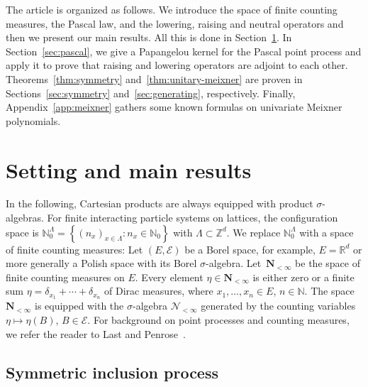 \documentclass[pdftex]{sigma}
\numberwithin{equation}{section}
\newcommand{\N}{\mathbb{N}}
\newcommand{\R}{\mathbb{R}}
\newcommand{\Z}{\mathbb{Z}}
\newcommand{\set}[1]{{\left \{ #1 \right \}}}
\newcommand{\1}{\mathbbm{1}}
\begin{document}
The article is organized as follows. We introduce the space of finite counting measures, the Pascal law, and the lowering, raising and neutral operators and then we present our main results. All this is done in Section~\ref{sec:setting-results}. In Section~\ref{sec:pascal}, we give a Papangelou kernel for the Pascal point process and apply it to prove that raising and lowering operators are adjoint to each other. Theorems~\ref{thm:symmetry} and~\ref{thm:unitary-meixner} are proven in Sections~\ref{sec:symmetry} and~\ref{sec:generating}, respectively. Finally, Appendix~\ref{app:meixner} gathers some known formulas on univariate Meixner polynomials.

\section{Setting and main results} \label{sec:setting-results}

In the following, Cartesian products are always equipped with product $\sigma$-algebras. For finite interacting particle systems on lattices, the configuration space is $\N_0^\Lambda = \set{(n_x)_{x\in \Lambda}\colon n_x \in \N_0}$ with $\Lambda\subset\Z^d$. We replace $\N_0^\Lambda$ with a space of finite counting measures:
Let $(E,\mathcal E)$ be a Borel space, for example, $E= \R^d$ or more generally a Polish space with its Borel $\sigma$-algebra. Let~$\mathbf N_{<\infty}$ be the space of finite counting measures on $E$. Every element $\eta \in \mathbf N_{<\infty}$ is either zero or a finite sum $\eta= \delta_{x_1}+\cdots + \delta_{x_n}$ of Dirac measures, where $x_1, \ldots, x_n \in E$, $n \in \N$. The space $\mathbf N_{<\infty}$ is equipped with the $\sigma$-algebra $\mathcal N_{<\infty}$ generated by the counting variables $\eta \mapsto \eta(B)$, $B\in \mathcal E$.
For background on point processes and counting measures, we refer the reader to Last and Penrose~\cite{LastPenroseLecturesOnThePoissonProcess}.

\subsection{Symmetric inclusion process}
\end{document}
